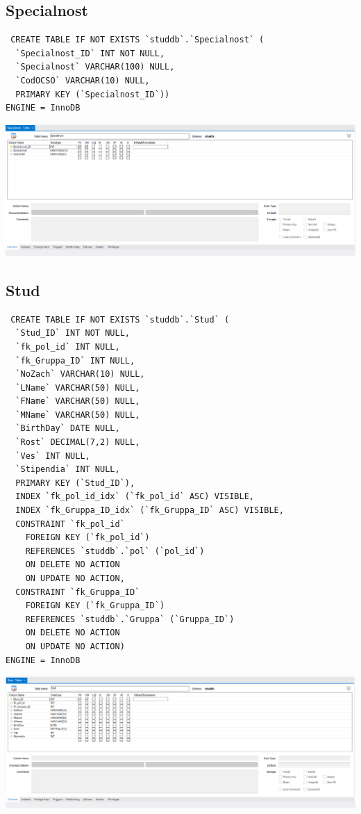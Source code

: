 \documentclass[a4paper, 12pt]{article}
\begin{document}
\subsection{Specialnost}
\begin{lstlisting}
 CREATE TABLE IF NOT EXISTS `studdb`.`Specialnost` (
  `Specialnost_ID` INT NOT NULL,
  `Specialnost` VARCHAR(100) NULL,
  `CodOCSO` VARCHAR(10) NULL,
  PRIMARY KEY (`Specialnost_ID`))
ENGINE = InnoDB 
\end{lstlisting}
\includegraphics[width=\textwidth]{2-13.png}

\subsection{Stud}
\begin{lstlisting}
 CREATE TABLE IF NOT EXISTS `studdb`.`Stud` (
  `Stud_ID` INT NOT NULL,
  `fk_pol_id` INT NULL,
  `fk_Gruppa_ID` INT NULL,
  `NoZach` VARCHAR(10) NULL,
  `LName` VARCHAR(50) NULL,
  `FName` VARCHAR(50) NULL,
  `MName` VARCHAR(50) NULL,
  `BirthDay` DATE NULL,
  `Rost` DECIMAL(7,2) NULL,
  `Ves` INT NULL,
  `Stipendia` INT NULL,
  PRIMARY KEY (`Stud_ID`),
  INDEX `fk_pol_id_idx` (`fk_pol_id` ASC) VISIBLE,
  INDEX `fk_Gruppa_ID_idx` (`fk_Gruppa_ID` ASC) VISIBLE,
  CONSTRAINT `fk_pol_id`
    FOREIGN KEY (`fk_pol_id`)
    REFERENCES `studdb`.`pol` (`pol_id`)
    ON DELETE NO ACTION
    ON UPDATE NO ACTION,
  CONSTRAINT `fk_Gruppa_ID`
    FOREIGN KEY (`fk_Gruppa_ID`)
    REFERENCES `studdb`.`Gruppa` (`Gruppa_ID`)
    ON DELETE NO ACTION
    ON UPDATE NO ACTION)
ENGINE = InnoDB 
\end{lstlisting}
\includegraphics[width=\textwidth]{2-14.png}
\end{document}
